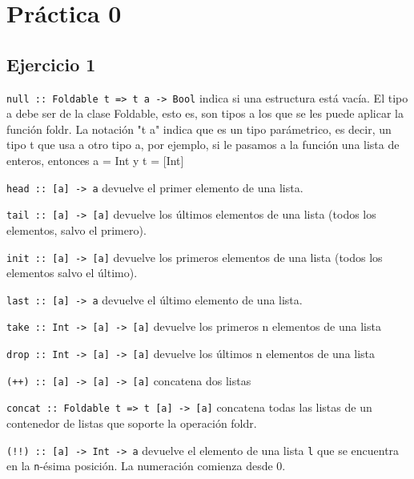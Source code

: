 \section{Práctica 0}

\subsection{Ejercicio 1}
\texttt{null :: Foldable t => t a -> Bool} indica si una estructura está vacía. El tipo a debe ser de la clase Foldable, esto es, son tipos a los que se les puede aplicar la función foldr. La notación "t a" indica que es un tipo parámetrico, es decir, un tipo t que usa a otro tipo a, por ejemplo, si le pasamos a la función una lista de enteros, entonces a = Int y t = [Int]

\vspace*{5mm}
\texttt{head :: [a] -> a} devuelve el primer elemento de una lista.

\vspace*{5mm}
\texttt{tail :: [a] -> [a]} devuelve los últimos elementos de una lista (todos los elementos, salvo el primero).

\vspace*{5mm}
\texttt{init :: [a] -> [a]} devuelve los primeros elementos de una lista (todos los elementos salvo el último).

\vspace*{5mm}
\texttt{last :: [a] -> a} devuelve el último elemento de una lista.


\vspace*{5mm}
\texttt{take :: Int -> [a] -> [a]} devuelve los primeros n elementos de una lista

\vspace*{5mm}
\texttt{drop :: Int -> [a] -> [a]} devuelve los últimos n elementos de una lista

\vspace*{5mm}
\texttt{(++) :: [a] -> [a] -> [a]} concatena dos listas

\vspace*{5mm}
\texttt{concat :: Foldable t => t [a] -> [a]} concatena todas las listas de un contenedor de listas que soporte la operación foldr.

\vspace*{5mm}
\texttt{(!!) :: [a] -> Int -> a} devuelve el elemento de una lista 
\texttt{l} que se encuentra en la \texttt{n}-ésima posición. La numeración comienza desde 0.

